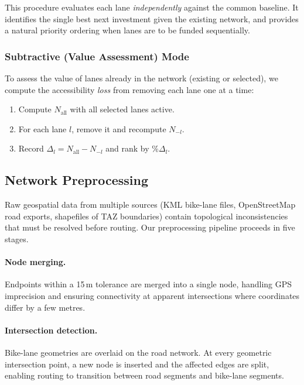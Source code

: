 \documentclass[12pt,a4paper]{article}
\begin{document}
This procedure evaluates each lane \emph{independently} against the common baseline. It identifies the single best next investment given the existing network, and provides a natural priority ordering when lanes are to be funded sequentially.

\subsubsection{Subtractive (Value Assessment) Mode}

To assess the value of lanes already in the network (existing or selected), we compute the accessibility \emph{loss} from removing each lane one at a time:

\begin{enumerate}[leftmargin=*,nosep]
    \item Compute $N_{\mathrm{all}}$ with all selected lanes active.
    \item For each lane $l$, remove it and recompute $N_{-l}$.
    \item Record $\Delta_l = N_{\mathrm{all}} - N_{-l}$ and rank by $\%\Delta_l$.
\end{enumerate}

\subsection{Network Preprocessing}
\label{sec:preprocessing}

Raw geospatial data from multiple sources (KML bike-lane files, OpenStreetMap road exports, shapefiles of TAZ boundaries) contain topological inconsistencies that must be resolved before routing. Our preprocessing pipeline proceeds in five stages.

\paragraph{Node merging.}
Endpoints within a 15\,m tolerance are merged into a single node, handling GPS imprecision and ensuring connectivity at apparent intersections where coordinates differ by a few metres.

\paragraph{Intersection detection.}
Bike-lane geometries are overlaid on the road network. At every geometric intersection point, a new node is inserted and the affected edges are split, enabling routing to transition between road segments and bike-lane segments.
\end{document}
